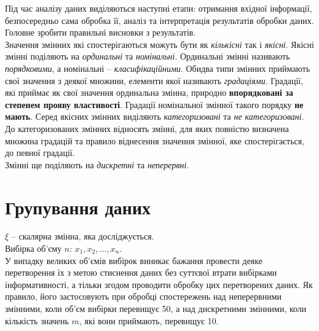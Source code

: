 




Під час аналізу даних виділяються наступні етапи: отримання вхідної інформації, безпосередньо сама обробка її, аналіз та інтерпретація результатів обробки даних. \\

Головне зробити правильні висновки з результатів. \\

Значення змінних які спостерігаються можуть бути як \textit{кількісні} так і \textit{якісні}. Якісні змінні поділяють на \textit{ординальні} та \textit{номінальні}. Ординальні змінні називають \textit{порядковими}, а номінальні -- \textit{класифікаційними}. Обидва типи змінних приймають свої значення з деякої множини, елементи якої називають \textit{градаціями}. Градації, які приймає як свої значення ординальна змінна, природно \textbf{впорядковані за степенем прояву властивості}. Градації номінальної змінної такого порядку \textbf{не мають}. Серед якісних змінних виділяють \textit{категоризовані} та \textit{не категоризовані}. \\

До категоризованих змінних відносять змінні, для яких повністю визначена множина градацій та правило віднесення значення змінної, яке спостерігається, до певної градації. \\

Змінні ще поділяють на \textit{дискретні} та \textit{неперервні}.

\section{Групування даних}

$\xi$ -- скалярна змінна, яка досліджується. \\

Вибірка об'єму $n$: $x_1, x_2, \ldots, x_n$. \\

У випадку великих об'ємів вибірок виникає бажання провести деяке перетворення їх з метою стиснення даних без суттєвої втрати вибірками інформативності, а тільки згодом проводити обробку цих перетворених даних. Як правило, його застосовують при обробці спостережень над неперервними змінними, коли об'єм вибірки перевищує 50, а над дискретними змінними, коли кількість значень $m$, які вони приймають, перевищує 10. \\

